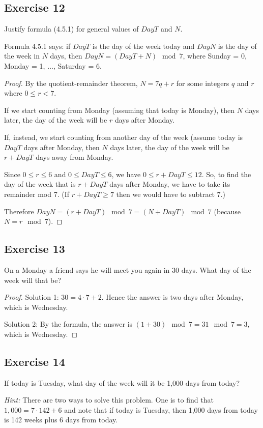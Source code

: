 \documentclass[14pt]{extarticle}
\begin{document}
\subsection{Exercise 12}
Justify formula (4.5.1) for general values of $DayT$ and $N$.

Formula 4.5.1 says: if $DayT$ is the day of the week today and $DayN$ is the day of the week in $N$ days, then $DayN = (DayT + N) \mod 7$, where Sunday = 0, Monday = 1, $\ldots$, Saturday = 6.

\begin{proof}
By the quotient-remainder theorem, $N = 7q + r$ for some integers $q$ and $r$ where $0 \leq r < 7$.

If we start counting from Monday (assuming that today is Monday), then $N$ days later, the day of the week will be $r$ days after Monday.

If, instead, we start counting from another day of the week (assume today is $DayT$ days after Monday, then $N$ days later, the day of the week will be $r+DayT$ days away from Monday.

Since $0 \leq r \leq 6$ and $0 \leq DayT \leq 6$, we have $0 \leq r + DayT \leq 12$. So, to find the day of the week that is $r+DayT$ days after Monday, we have to take its remainder mod 7. (If $r+DayT \geq 7$ then we would have to subtract 7.)

Therefore $DayN = (r+DayT) \mod 7 = (N + DayT) \mod 7$ (because $N = r \mod 7$).
\end{proof}

\subsection{Exercise 13}
On a Monday a friend says he will meet you again in 30 days. What day of the week will that be?

\begin{proof}
Solution 1: $30 = 4\cdot 7 + 2$. Hence the answer is two days after Monday, which is Wednesday.

Solution 2: By the formula, the answer is $(1 + 30) \mod
7 = 31 \mod 7 = 3$, which is Wednesday.
\end{proof}

\subsection{Exercise 14}
If today is Tuesday, what day of the week will it be 1,000 days from today?

{\it Hint:} There are two ways to solve this problem. One is to find that $1,000 = 7\cdot 142 + 6$ and note that if today is Tuesday, then 1,000 days from today is 142 weeks plus 6 days from today. 
\end{document}
